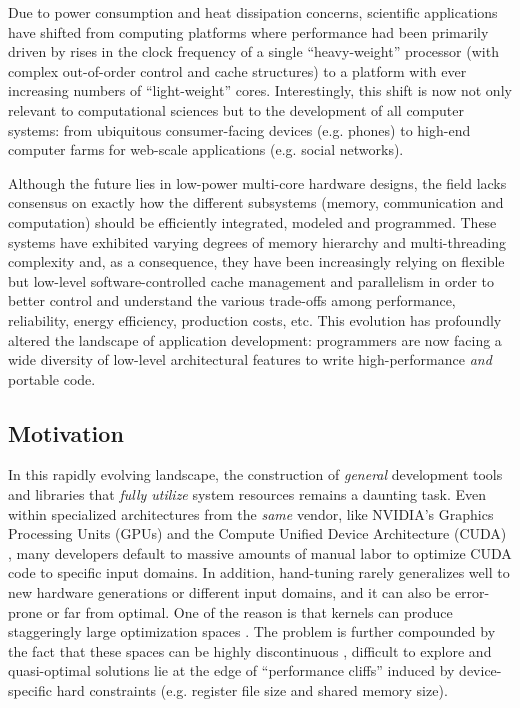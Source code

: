 \documentclass{sig-alternate}
\begin{document}
Due to power consumption and heat dissipation concerns, scientific applications
have shifted from computing platforms where performance had been primarily
driven by rises in the clock frequency of a single ``heavy-weight'' processor
(with complex out-of-order control and cache structures) to a platform with
ever increasing numbers of ``light-weight'' cores. Interestingly, this shift is
now not only relevant to computational sciences but to the development of all
computer systems: from ubiquitous consumer-facing devices (e.g. phones) to
high-end computer farms for web-scale applications (e.g. social networks).


Although the future lies in low-power multi-core hardware designs, the field
lacks  consensus on exactly how the different subsystems (memory,
communication and computation) should be efficiently integrated, modeled and
programmed. These systems have exhibited varying degrees of memory hierarchy
and multi-threading complexity and, as a consequence, they have been
increasingly relying on flexible but low-level software-controlled cache
management and parallelism \citep{asanovic2006landscape} in order to better
control and understand the various trade-offs among performance, reliability,
energy efficiency, production costs, etc. This evolution has profoundly
altered the landscape of application development: programmers are now
facing a wide diversity of low-level architectural features to write
high-performance \emph{and} portable code.

\subsection{Motivation}


In this rapidly evolving landscape, the construction of \emph{general}
development tools and libraries that \emph{fully utilize} system resources
remains a daunting task. Even within specialized architectures from the
\emph{same} vendor, like NVIDIA's Graphics Processing Units (GPUs) and the
Compute Unified Device Architecture (CUDA) \citep{nickolls2008scalable,
nvidia2011cuda}, many developers default to massive amounts of manual labor
to optimize CUDA code to specific input domains. In addition, hand-tuning
rarely generalizes well to new hardware generations or different input
domains, and it can also be error-prone or far from optimal. One of the
reason is that kernels can produce staggeringly large optimization spaces
\citep{datta2008stencil}. The problem is further compounded by the fact that
these spaces can be highly discontinuous \citep{ryoo2008program}, difficult
to explore and quasi-optimal solutions lie at the edge of ``performance
cliffs'' induced by device-specific hard constraints (e.g. register file
size and shared memory size).
\end{document}
